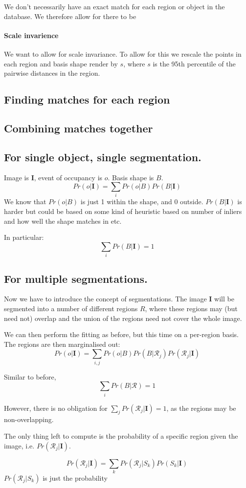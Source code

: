 \documentclass[10pt,a4paper]{article}
\newcommand{\prob}{Pr}
\newcommand{\rgbdimage}{\mathbf{I}}
\newcommand{\imregion}{\mathcal{R}}
\newcommand{\occ}{o}
\newcommand{\basisshape}{B}
\begin{document}
We don't necessarily have an exact match for each region or object in the database. We therefore allow for there to be 

\paragraph{Scale invarience}
We want to allow for scale invariance. To allow for this we rescale the points in each region and basis shape render by $s$, where $s$ is the 95th percentile of the pairwise distances in the region.

\subsection{Finding matches for each region}


\subsection{Combining matches together}



\subsection{For single object, single segmentation.}

Image is $\rgbdimage$, event of occupancy is $o$. Basis shape is $\basisshape$.
$$
\prob(\occ | \rgbdimage) = \sum_i \prob(\occ | \basisshape) \prob(\basisshape | \rgbdimage)
$$ 
We know that $\prob(\occ|\basisshape)$ is just 1 within the shape, and 0 outside. $\prob(\basisshape|\rgbdimage)$ is harder but could be based on some kind of heuristic based on number of inliers and how well the shape matches in etc.

In particular:
$$ 
\sum_i \prob(\basisshape|\rgbdimage) = 1
$$

\subsection{For multiple segmentations.}

Now we have to introduce the concept of segmentations. The image $\rgbdimage$ will be segmented into a number of different regions $R$, where these regions may (but need not) overlap and the union of the regions need not cover the whole image.

We can then perform the fitting as before, but this time on a per-region basis. The regions are then marginalised out:
$$
\prob(\occ | \rgbdimage) = \sum_{i,j} \prob(\occ|\basisshape)\prob(\basisshape|\imregion_j)\prob(\imregion_j|\rgbdimage)
$$

Similar to before,
$$
\sum_i \prob(\basisshape|\imregion) = 1
$$

However, there is no obligation for $\sum_j \prob(\imregion_j | \rgbdimage) = 1$, as the regions may be non-overlapping.

The only thing left to compute is the probability of a specific region given the image, i.e. $\prob(\imregion_j|\rgbdimage)$. 

$$
\prob(\imregion_j | \rgbdimage) = \sum_{k} \prob(\imregion_j|S_k)\prob(S_k|\rgbdimage)
$$
$\prob(\imregion_j | S_k)$ is just the probability 
\end{document}
